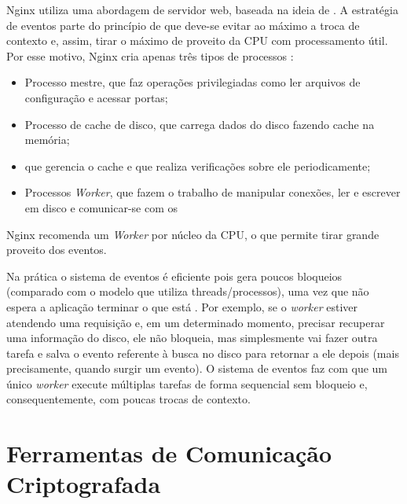 Nginx utiliza uma  abordagem de servidor web, baseada na ideia de .
A estratégia de eventos parte do princípio de que deve-se evitar ao máximo a troca
de contexto e, assim, tirar o máximo de proveito da CPU com processamento útil.
Por esse motivo, Nginx cria apenas três tipos de processos
\citep{nginx_architecture}:

\begin{itemize}
  \item Processo mestre, que faz operações privilegiadas como ler arquivos de configuração e acessar portas;
  \item Processo de cache de disco, que carrega dados do disco fazendo cache na memória;
  \item {} que gerencia o cache e que realiza verificações sobre ele periodicamente;
  \item Processos \emph{Worker}, que fazem o trabalho de manipular conexões, ler e escrever em disco e comunicar-se com os 
\end{itemize}

Nginx recomenda um \emph{Worker} por núcleo da CPU, o que permite tirar
grande proveito dos eventos.

Na prática o sistema de eventos é eficiente pois gera poucos bloqueios
(comparado com o modelo que utiliza threads/processos), uma vez que não
espera a aplicação terminar o que está . Por exemplo, se o
\emph{worker} estiver atendendo uma requisição e, em um determinado momento,
precisar recuperar uma informação do disco, ele não bloqueia, mas
simplesmente vai fazer outra tarefa e salva o evento referente à busca no disco
para retornar a ele depois (mais precisamente, quando surgir um evento). O
sistema de eventos faz com que um único \emph{worker} execute múltiplas
tarefas de forma sequencial sem bloqueio e, consequentemente, com poucas trocas
de contexto.

\section{Ferramentas de Comunicação Criptografada}
\label{sec:com_enc}

